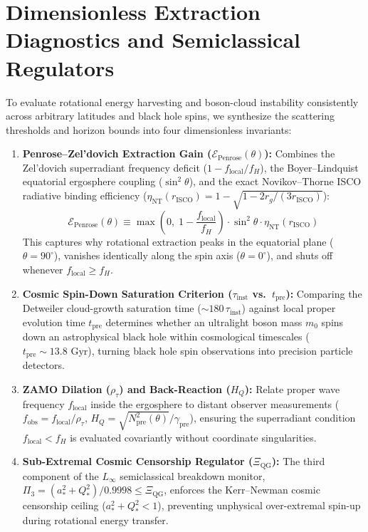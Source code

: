 \documentclass[11pt,a4paper]{article}
\begin{document}
\section{Dimensionless Extraction Diagnostics and Semiclassical Regulators}
To evaluate rotational energy harvesting and boson-cloud instability consistently across arbitrary latitudes and black hole spins, we synthesize the scattering thresholds and horizon bounds into four dimensionless invariants:
\begin{enumerate}
\item \textbf{Penrose--Zel'dovich Extraction Gain ($\mathcal{E}_{\text{Penrose}}(\theta)$):} Combines the Zel'dovich superradiant frequency deficit ($1 - f_{\text{local}}/f_H$), the Boyer--Lindquist equatorial ergosphere coupling ($\sin^2\theta$), and the exact Novikov--Thorne ISCO radiative binding efficiency ($\eta_{\text{NT}}(r_{\text{ISCO}}) = 1 - \sqrt{1 - 2r_g / (3 r_{\text{ISCO}})}$):
\begin{equation}
\mathcal{E}_{\text{Penrose}}(\theta) \equiv \max\left(0,\; 1 - \frac{f_{\text{local}}}{f_H}\right) \cdot \sin^2\theta \cdot \eta_{\text{NT}}(r_{\text{ISCO}})
\end{equation}
This captures why rotational extraction peaks in the equatorial plane ($\theta = 90^\circ$), vanishes identically along the spin axis ($\theta = 0^\circ$), and shuts off whenever $f_{\text{local}} \ge f_H$.
\item \textbf{Cosmic Spin-Down Saturation Criterion ($\tau_{\text{inst}}$ vs.\ $t_{\text{pre}}$):} Comparing the Detweiler cloud-growth saturation time ($\sim 180\,\tau_{\text{inst}}$) against local proper evolution time $t_{\text{pre}}$ determines whether an ultralight boson mass $m_0$ spins down an astrophysical black hole within cosmological timescales ($t_{\text{pre}} \sim 13.8\text{ Gyr}$), turning black hole spin observations into precision particle detectors.
\item \textbf{ZAMO Dilation ($\rho_\tau$) and Back-Reaction ($H_Q$):} Relate proper wave frequency $f_{\text{local}}$ inside the ergosphere to distant observer measurements ($f_{\text{obs}} = f_{\text{local}} / \rho_\tau$, $H_Q = \sqrt{N^2_{\text{pre}}(\theta)} / \gamma_{\text{pre}}$), ensuring the superradiant condition $f_{\text{local}} < f_H$ is evaluated covariantly without coordinate singularities.
\item \textbf{Sub-Extremal Cosmic Censorship Regulator ($\Xi_{\text{QG}}$):} The third component of the $L_\infty$ semiclassical breakdown monitor, $\Pi_3 = (a_*^2 + Q_*^2)/0.9998 \le \Xi_{\text{QG}}$, enforces the Kerr--Newman cosmic censorship ceiling ($a_*^2 + Q_*^2 < 1$), preventing unphysical over-extremal spin-up during rotational energy transfer.
\end{enumerate}
\end{document}
